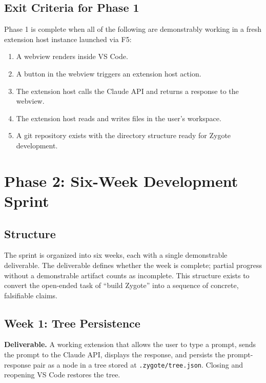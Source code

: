 \documentclass[11pt,letterpaper]{article}
\begin{document}
\subsection*{Exit Criteria for Phase 1}

Phase 1 is complete when all of the following are demonstrably working in a fresh extension host instance launched via F5:

\begin{enumerate}
  \item A webview renders inside VS Code.
  \item A button in the webview triggers an extension host action.
  \item The extension host calls the Claude API and returns a response to the webview.
  \item The extension host reads and writes files in the user's workspace.
  \item A git repository exists with the directory structure ready for Zygote development.
\end{enumerate}

\section{Phase 2: Six-Week Development Sprint}
\label{sec:phase2}

\subsection*{Structure}

The sprint is organized into six weeks, each with a single demonstrable deliverable. The deliverable defines whether the week is complete; partial progress without a demonstrable artifact counts as incomplete. This structure exists to convert the open-ended task of ``build Zygote'' into a sequence of concrete, falsifiable claims.

\subsection*{Week 1: Tree Persistence}

\textbf{Deliverable.} A working extension that allows the user to type a prompt, sends the prompt to the Claude API, displays the response, and persists the prompt-response pair as a node in a tree stored at \texttt{.zygote/tree.json}. Closing and reopening VS Code restores the tree.
\end{document}
